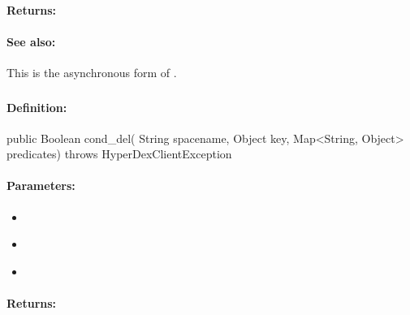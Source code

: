 \paragraph{Returns:}


\paragraph{See also:}  This is the asynchronous form of .

\pagebreak
\subsubsection{}
\label{api:java:cond_del}


\paragraph{Definition:}
\begin{javacode}
public Boolean cond_del(
        String spacename,
        Object key,
        Map<String, Object> predicates) throws HyperDexClientException
\end{javacode}

\paragraph{Parameters:}
\begin{itemize}[noitemsep]
\item {}\\

\item {}\\

\item {}\\

\end{itemize}

\paragraph{Returns:}


\pagebreak

